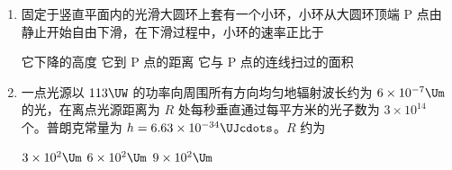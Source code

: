 \documentclass[\gkver]{gaokaozhenti}
\begin{document}
\begin{enumerate}
{解得 $T=\frac{5}{8}F$

对任意小球由牛顿第二定律可得：$T=ma$

解得：$a=\frac{5F}{8m}$

故 A 正确，BCD 错误。

故选 A。
}

\item
固定于竖直平面内的光滑大圆环上套有一个小环，小环从大圆环顶端 P 点由静止开始自由下滑，在下滑过程中，小环的速率正比于

\onepicture[w=4.0cm]{}

{它下降的高度}
{它到 P 点的距离}
{它与 P 点的连线扫过的面积}


\item
一点光源以 $113\UW$ 的功率向周围所有方向均匀地辐射波长约为 $6\times10^{-7}\Um$ 的光，在离点光源距离为 $R$ 处每秒垂直通过每平方米的光子数为 $3\times10^{14}$ 个。普朗克常量为 $h = 6.63\times10^{-34}\UJcdots$。$R$ 约为

{$3\times10^{2}\Um$}
{$6\times10^{2}\Um$}
{$9\times10^{2}\Um$}

\end{enumerate}
\end{document}
